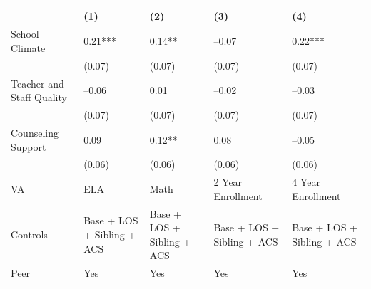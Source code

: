 \begin{table}[tbp] \centering
{}

{\footnotesize
\begin{tabularx}{\linewidth}{lCCCC}

\toprule
&{(1)}&{(2)}&{(3)}&{(4)} \tabularnewline
\midrule \addlinespace[\belowrulesep]
School Climate&0.21***&0.14**&--0.07&0.22*** \tabularnewline
&(0.07)&(0.07)&(0.07)&(0.07) \tabularnewline
Teacher and Staff Quality&--0.06&0.01&--0.02&--0.03 \tabularnewline
&(0.07)&(0.07)&(0.07)&(0.07) \tabularnewline
Counseling Support&0.09&0.12**&0.08&--0.05 \tabularnewline
&(0.06)&(0.06)&(0.06)&(0.06) \tabularnewline
\midrule VA&ELA&Math&2 Year Enrollment&4 Year Enrollment \tabularnewline
Controls&Base + LOS + Sibling + ACS&Base + LOS + Sibling + ACS&Base + LOS + Sibling + ACS&Base + LOS + Sibling + ACS \tabularnewline
Peer&Yes&Yes&Yes&Yes \tabularnewline
\bottomrule 

\end{tabularx}
}
\end{table}
